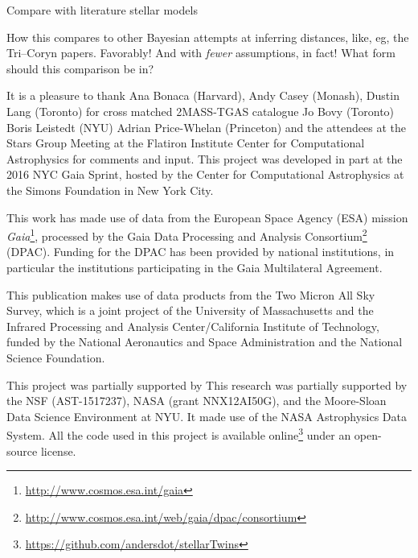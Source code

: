 \documentclass[modern]{aastex61}
\newcommand{\acronym}[1]{{\small{#1}}}
\newcommand{\project}[1]{\textsl{#1}}
\newcommand{\gaia}{\project{Gaia}}
\begin{document}
Compare with literature stellar models

How this compares to other Bayesian attempts at inferring distances,
like, eg, the Tri--Coryn papers. Favorably! And with \emph{fewer}
assumptions, in fact! What form should this comparison be in?

\acknowledgments It is a pleasure to thank
  Ana Bonaca (Harvard),
  Andy Casey (Monash),
  Dustin Lang (Toronto) for cross matched 2MASS-TGAS catalogue
  Jo Bovy (Toronto)
  Boris Leistedt (NYU)
  Adrian Price-Whelan (Princeton)
and the attendees at the Stars Group Meeting at the Flatiron Institute
Center for Computational Astrophysics for comments and input.
This project was developed in part at the 2016 \acronym{NYC} Gaia Sprint, hosted
by the Center for Computational Astrophysics at the Simons Foundation
in New York City.

This work has made use of data from the European Space Agency (\acronym{ESA})
mission \gaia\footnote{\url{http://www.cosmos.esa.int/gaia}}, processed by the Gaia
Data Processing and Analysis Consortium\footnote{\url{http://www.cosmos.esa.int/web/gaia/dpac/consortium}} (\acronym{DPAC}). Funding for the
\acronym{DPAC} has been provided by national institutions, in particular the
institutions participating in the Gaia Multilateral Agreement.

This publication makes use of data products from the Two Micron All
Sky Survey, which is a joint project of the
University of Massachusetts and the Infrared Processing and Analysis
Center/California Institute of Technology, funded by the National
Aeronautics and Space Administration and the National Science
Foundation.

This project was partially supported by This research was partially supported by
  the \acronym{NSF} (\acronym{AST-1517237}),
  \acronym{NASA} (grant \acronym{NNX12AI50G}),
  and the Moore-Sloan Data Science Environment at \acronym{NYU}.
It made use of the \acronym{NASA} Astrophysics Data System.
All the code used in this project is available online\footnote{\url{https://github.com/andersdot/stellarTwins}} under an open-source license.




\clearpage
\end{document}
